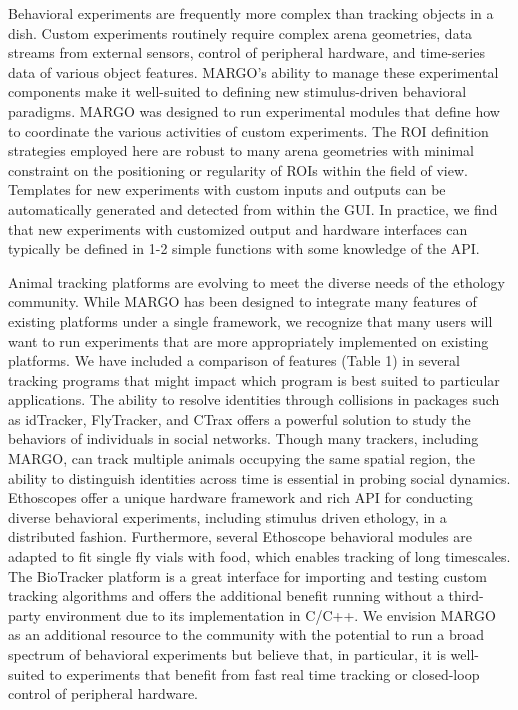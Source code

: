 \documentclass[10pt]{article}
\begin{document}
\begin{multicols}{2}
Behavioral experiments are frequently more complex than tracking objects in a dish. Custom experiments routinely require complex arena geometries, data streams from external sensors, control of peripheral hardware, and time-series data of various object features. MARGO's ability to manage these experimental components make it well-suited to defining new stimulus-driven behavioral paradigms. MARGO was designed to run experimental modules that define how to coordinate the various activities of custom experiments. The ROI definition strategies employed here are robust to many arena geometries with minimal constraint on the positioning or regularity of ROIs within the field of view. Templates for new experiments with custom inputs and outputs can be automatically generated and detected from within the GUI. In practice, we find that new experiments with customized output and hardware interfaces can typically be defined in 1-2 simple functions with some knowledge of the API.

Animal tracking platforms are evolving to meet the diverse needs of the ethology community. While MARGO has been designed to integrate many features of existing platforms under a single framework, we recognize that many users will want to run experiments that are more appropriately implemented on existing platforms. We have included a comparison of features (Table 1) in several tracking programs that might impact which program is best suited to particular applications. The ability to resolve identities through collisions in packages such as idTracker, FlyTracker, and CTrax offers a powerful solution to study the behaviors of individuals in social networks. Though many trackers, including MARGO, can track multiple animals occupying the same spatial region, the ability to distinguish identities across time is essential in probing social dynamics. Ethoscopes offer a unique hardware framework and rich API for conducting diverse behavioral experiments, including stimulus driven ethology, in a distributed fashion. Furthermore, several Ethoscope behavioral modules are adapted to fit single fly vials with food, which enables tracking of long timescales. The BioTracker platform is a great interface for importing and testing custom tracking algorithms and offers the additional benefit running without a third-party environment due to its implementation in C/C++.  We envision MARGO as an additional resource to the community with the potential to run a broad spectrum of behavioral experiments but believe that, in particular, it is well-suited to experiments that benefit from fast real time tracking or closed-loop control of peripheral hardware. 


\end{multicols}
\end{document}
